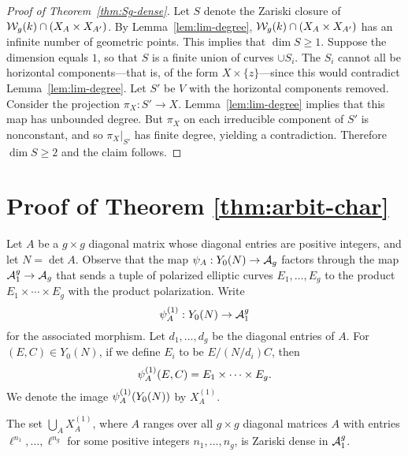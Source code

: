 \documentclass{amsart}
\begin{document}
\begin{proof}[Proof of Theorem~\ref{thm:Sg-dense}]
  Let $S$ denote the Zariski closure of $\mathcal{W}_g(k) \cap (X_A \times X_{A'})$. By Lemma~\ref{lem:lim-degree}, $\mathcal{W}_g(k) \cap (X_A \times X_{A'})$ has an infinite number of geometric points. This implies that $\dim S \geq 1$. Suppose the dimension equals $1$, so that $S$ is a finite union of curves $\cup S_i$. The $S_i$ cannot all be horizontal components---that is, of the form $X \times \{z\}$---since this would contradict Lemma~\ref{lem:lim-degree}. Let $S'$ be $V$ with the horizontal components removed. Consider the projection $\pi_X: S' \to X$. Lemma~\ref{lem:lim-degree} implies that this map has unbounded degree. But $\pi_X$ on each irreducible component of $S'$ is nonconstant, and so $\pi_X|_{S'}$ has finite degree, yielding a contradiction. Therefore $\dim S \geq 2$ and the claim follows.
\end{proof}







\section{Proof of Theorem \ref{thm:arbit-char}}
\label{sec:characteristic-p}

Let $A$ be a $g \times g$ diagonal matrix whose diagonal entries are positive integers, and let $N = \det A$. Observe that the map $\psi_{A}: Y_0(N) \to \mathcal{A}_g$ factors through the map $\mathcal{A}_1^g \to \mathcal{A}_g$ that sends a tuple of polarized elliptic curves $E_1,\dots,E_g$ to the product $E_1 \times \cdots \times E_g$ with the product polarization. Write
\[
\psi_{A}^{(1)}: Y_0(N) \to \mathcal{A}_1^g
\]
for the associated morphism. Let $d_1, \ldots, d_g$ be the diagonal entries of $A$. For $(E, C) \in Y_0(N)$, if we define $E_i$ to be $E/(N/d_i)C$, then
\[
  \psi_{A}^{(1)}(E,C) = E_1 \times \cdots \times E_g.
\]
We denote the image $\psi_{A}^{(1)}(Y_0(N))$ by $X^{(1)}_A$.

\begin{theorem}\label{thm:curves-dense-a1}
  The set $\bigcup_A X^{(1)}_A$, where $A$ ranges over all $g \times g$ diagonal matrices $A$ with entries $\ell^{n_1},\dots,\ell^{n_g}$ for some positive integers $n_1,\dots,n_g$, is Zariski dense in $\mathcal{A}_1^g$.
\end{theorem}
\end{document}
